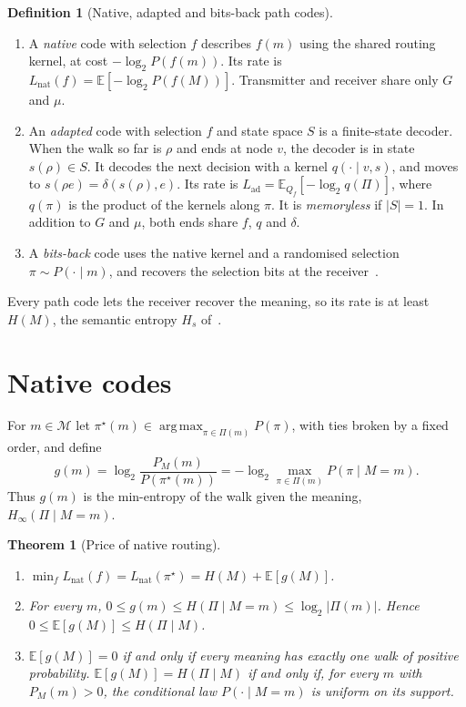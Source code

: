 \documentclass[11pt]{article}
\newtheorem{theorem}{Theorem}
\theoremstyle{definition}
\newtheorem{definition}{Definition}
\theoremstyle{remark}
\newcommand{\M}{\mathcal{M}}
\newcommand{\Pset}{\Pi}
\newcommand{\E}{\mathbb{E}}
\DeclareMathOperator*{\argmax}{arg\,max}
\begin{document}
\begin{definition}[Native, adapted and bits-back path codes]\label{def:codes}
\begin{enumerate}
\item A \emph{native} code with selection $f$ describes $f(m)$ using the shared routing kernel, at cost $-\log_2 P(f(m))$. Its rate is $L_{\mathrm{nat}}(f)=\E[-\log_2 P(f(M))]$. Transmitter and receiver share only $G$ and $\mu$.
\item An \emph{adapted} code with selection $f$ and state space $S$ is a finite-state decoder. When the walk so far is $\rho$ and ends at node $v$, the decoder is in state $s(\rho)\in S$. It decodes the next decision with a kernel $q(\cdot\mid v,s)$, and moves to $s(\rho e)=\delta(s(\rho),e)$. Its rate is $L_{\mathrm{ad}}=\E_{Q_f}[-\log_2 q(\Pi)]$, where $q(\pi)$ is the product of the kernels along $\pi$. It is \emph{memoryless} if $|S|=1$. In addition to $G$ and $\mu$, both ends share $f$, $q$ and $\delta$.
\item A \emph{bits-back} code uses the native kernel and a randomised selection $\pi\sim P(\cdot\mid m)$, and recovers the selection bits at the receiver~\cite{hinton1993,frey1997}.
\end{enumerate}
\end{definition}

Every path code lets the receiver recover the meaning, so its rate is at least $H(M)$, the semantic entropy $H_s$ of~\cite{niu2025}.

\section{Native codes}

For $m\in\M$ let $\pi^\star(m)\in\argmax_{\pi\in\Pset(m)}P(\pi)$, with ties broken by a fixed order, and define
\begin{equation}\label{eq:g}
g(m)=\log_2\frac{P_M(m)}{P(\pi^\star(m))}=-\log_2\max_{\pi\in\Pset(m)}P(\pi\mid M=m).
\end{equation}
Thus $g(m)$ is the min-entropy of the walk given the meaning, $H_\infty(\Pi\mid M=m)$.

\begin{theorem}[Price of native routing]\label{thm:native}
\begin{enumerate}
\item[(a)] $\min_f L_{\mathrm{nat}}(f)=L_{\mathrm{nat}}(\pi^\star)=H(M)+\E[g(M)]$.
\item[(b)] For every $m$, $0\le g(m)\le H(\Pi\mid M=m)\le\log_2|\Pset(m)|$. Hence $0\le\E[g(M)]\le H(\Pi\mid M)$.
\item[(c)] $\E[g(M)]=0$ if and only if every meaning has exactly one walk of positive probability. $\E[g(M)]=H(\Pi\mid M)$ if and only if, for every $m$ with $P_M(m)>0$, the conditional law $P(\cdot\mid M=m)$ is uniform on its support.
\end{enumerate}
\end{theorem}
\end{document}
